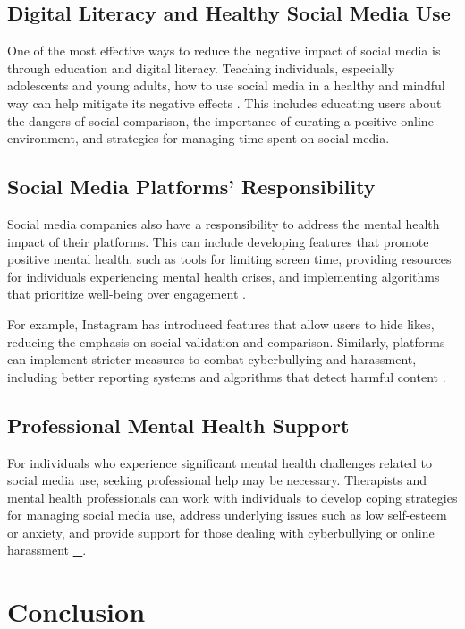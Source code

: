 \documentclass[12pt]{article}
\begin{document}
\subsection{Digital Literacy and Healthy Social Media Use}

One of the most effective ways to reduce the negative impact of social media is through education and digital literacy. Teaching individuals, especially adolescents and young adults, how to use social media in a healthy and mindful way can help mitigate its negative effects \cite{gerson2017}. This includes educating users about the dangers of social comparison, the importance of curating a positive online environment, and strategies for managing time spent on social media.

\subsection{Social Media Platforms’ Responsibility}

Social media companies also have a responsibility to address the mental health impact of their platforms. This can include developing features that promote positive mental health, such as tools for limiting screen time, providing resources for individuals experiencing mental health crises, and implementing algorithms that prioritize well-being over engagement \cite{statista2023}.

For example, Instagram has introduced features that allow users to hide likes, reducing the emphasis on social validation and comparison. Similarly, platforms can implement stricter measures to combat cyberbullying and harassment, including better reporting systems and algorithms that detect harmful content \cite{statista2023}.

\subsection{Professional Mental Health Support}

For individuals who experience significant mental health challenges related to social media use, seeking professional help may be necessary. Therapists and mental health professionals can work with individuals to develop coping strategies for managing social media use, address underlying issues such as low self-esteem or anxiety, and provide support for those dealing with cyberbullying or online harassment \ul{\_}\cite{smith2018}.

\section{Conclusion}
\end{document}
